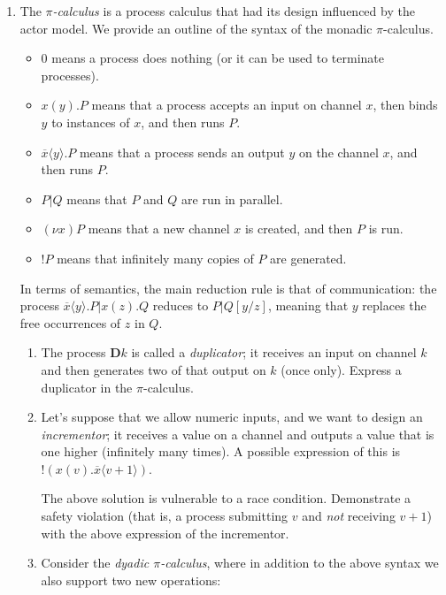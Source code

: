 \documentclass[12pt, a4paper]{article}
\begin{document}
\begin{enumerate}
\item The \textit{$\pi$-calculus} is a process calculus that had its design 
influenced by the actor model. We provide an outline of the syntax of the 
monadic $\pi$-calculus.

\begin{itemize}
\item $0$ means a process does nothing (or it can be used to terminate processes).
\item $x(y).P$ means that a process accepts an input on channel $x$, then binds
$y$ to instances of $x$, and then runs $P$.
\item $\overline{x} \langle y \rangle. P$ means that a process sends an output
$y$ on the channel $x$, and then runs $P$.
\item $P | Q$ means that $P$ and $Q$ are run in parallel.
\item $(\nu x) P$ means that a new channel $x$ is created, and then $P$ is run.
\item $!P$ means that infinitely many copies of $P$ are generated.
\end{itemize}

In terms of semantics, the main reduction rule is that of communication: the
process $\overline{x} \langle y \rangle. P | x(z). Q$ reduces to $P|Q[y/z]$,
meaning that $y$ replaces the free occurrences of $z$ in $Q$.

\begin{enumerate}
\item The process $\textbf{D} k$ is called a \textit{duplicator}; it receives
an input on channel $k$ and then generates two of that output on $k$ (once only). 
Express a duplicator in the $\pi$-calculus.

\item Let's suppose that we allow numeric inputs, and we want to design an
\textit{incrementor}; it receives a value on a channel and outputs a value that
is one higher (infinitely many times). A possible expression of this is
$!(x(v).\overline{x} \langle v + 1 \rangle)$.

The above solution is vulnerable to a race condition. Demonstrate a safety
violation (that is, a process submitting $v$ and \textit{not} receiving $v+1$) 
with the above expression of the incrementor.

\item Consider the \textit{dyadic $\pi$-calculus}, where in addition to the
above syntax we also support two new operations:


\end{enumerate}
\end{enumerate}
\end{document}
